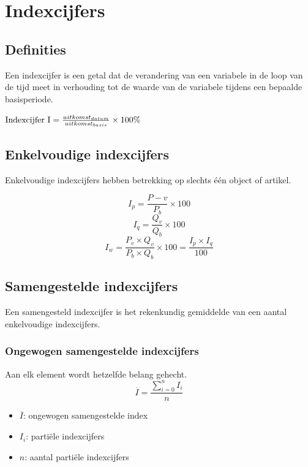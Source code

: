 \documentclass[a4paper,12pt]{article}
\begin{document}
\section{Indexcijfers}
\subsection{Definities}
Een indexcijfer is een getal dat de verandering van een variabele in de loop van de tijd meet in verhouding tot de waarde van de variabele tijdens een bepaalde basisperiode.

$\textnormal{Indexcijfer I} = \frac{uitkomst_{datum}}{uitkomst_{basis}}\times 100\%$

\subsection{Enkelvoudige indexcijfers}
Enkelvoudige indexcijfers hebben betrekking op slechts één object of artikel.

\begin{equation}
I_p = \frac{P-v}{P_b}\times 100
\end{equation}
\begin{equation}
I_q = \frac{Q_v}{Q_b} \times 100
\end{equation}
\begin{equation}
I_w = \frac{P_v \times Q_v}{P_b \times Q_b} \times 100 = \frac{I_p \times I_q}{100}
\end{equation}

\subsection{Samengestelde indexcijfers}
Een samengesteld indexcijfer is het rekenkundig gemiddelde van een aantal enkelvoudige indexcijfers.

\subsubsection{Ongewogen samengestelde indexcijfers}
Aan elk element wordt hetzelfde belang gehecht.
\begin{equation}
\overline{I}=\frac{\sum^n_{i=0}I_i}{n}
\end{equation}
\begin{itemize}
\item $\overline{I}$: ongewogen samengestelde index
\item $I_i$: partiële indexcijfers
\item $n$: aantal partiële indexcijfers
\end{itemize}
\end{document}
